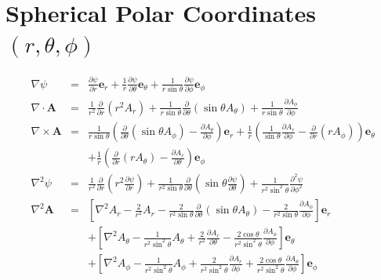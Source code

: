 \section{Spherical Polar Coordinates \texorpdfstring{$(r, \theta, \phi)$}{(r, theta, phi)}}
\begin{eqnarray}
    \nabla \psi &=& \frac{\partial \psi}{\partial r} \mathbf{e}_r + \frac{1}{r} \frac{\partial \psi}{\partial \theta} \mathbf{e}_\theta + \frac{1}{r \sin \theta} \frac{\partial \psi}{\partial \phi} \mathbf{e}_\phi \\
    \nabla \cdot \mathbf{A} &=& \frac{1}{r^2} \frac{\partial}{\partial r}\left(r^2 A_r\right) + \frac{1}{r \sin \theta} \frac{\partial}{\partial \theta}\left(\sin \theta A_\theta\right) + \frac{1}{r \sin \theta} \frac{\partial A_\phi}{\partial \phi} \\
    \nabla \times \mathbf{A} &=& \frac{1}{r \sin \theta} \left( \frac{\partial}{\partial \theta} \left(\sin \theta A_\phi\right) - \frac{\partial A_\theta}{\partial \phi} \right) \mathbf{e}_r + \frac{1}{r} \left( \frac{1}{\sin \theta} \frac{\partial A_r}{\partial \phi} - \frac{\partial}{\partial r}\left(r A_\phi\right) \right) \mathbf{e}_\theta \nonumber \\
    && + \frac{1}{r} \left( \frac{\partial}{\partial r}\left(r A_\theta\right) - \frac{\partial A_r}{\partial \theta} \right) \mathbf{e}_\phi \\
    \nabla^2 \psi &=& \frac{1}{r^2} \frac{\partial}{\partial r}\left(r^2 \frac{\partial \psi}{\partial r}\right) + \frac{1}{r^2 \sin \theta} \frac{\partial}{\partial \theta}\left(\sin \theta \frac{\partial \psi}{\partial \theta}\right) + \frac{1}{r^2 \sin^2 \theta} \frac{\partial^2 \psi}{\partial \phi^2} \\
    \nabla^2 \mathbf{A} &=& \left[\nabla^2 A_r - \frac{2}{r^2} A_r - \frac{2}{r^2 \sin \theta} \frac{\partial}{\partial \theta}\left(\sin \theta A_\theta\right) - \frac{2}{r^2 \sin \theta} \frac{\partial A_\phi}{\partial \phi}\right] \mathbf{e}_r \nonumber \\
    && + \left[\nabla^2 A_\theta - \frac{1}{r^2 \sin^2 \theta} A_\theta + \frac{2}{r^2} \frac{\partial A_r}{\partial \theta} - \frac{2 \cos \theta}{r^2 \sin^2 \theta} \frac{\partial A_\phi}{\partial \phi}\right] \mathbf{e}_\theta \nonumber \\
    && + \left[\nabla^2 A_\phi - \frac{1}{r^2 \sin^2 \theta} A_\phi + \frac{2}{r^2 \sin^2 \theta} \frac{\partial A_r}{\partial \phi} + \frac{2 \cos \theta}{r^2 \sin^2 \theta} \frac{\partial A_\theta}{\partial \phi}\right] \mathbf{e}_\phi
\end{eqnarray}
    

